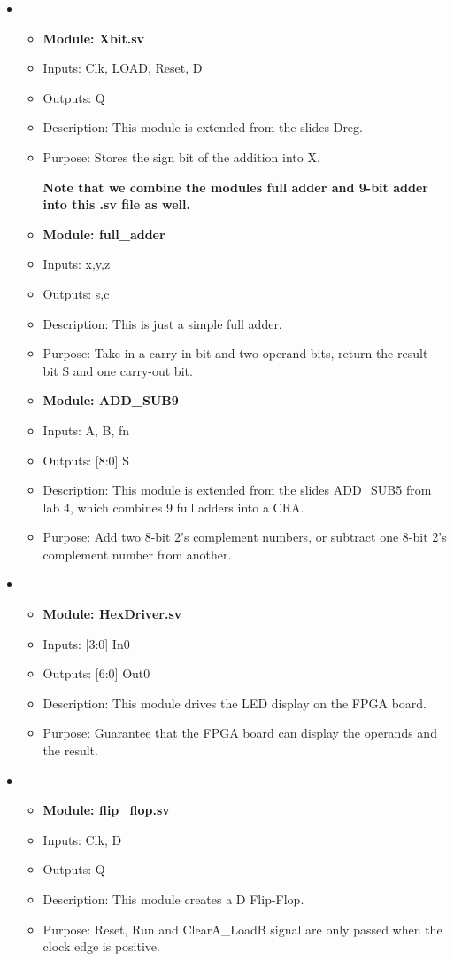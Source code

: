 \documentclass[11pt]{article}
\begin{document}
\begin{itemize}
    \item
    \begin{itemize}
        \item \textbf{Module: Xbit.sv}
        \item Inputs: Clk, LOAD, Reset, D
        \item Outputs: Q
        \item Description: This module is extended from the slides Dreg. 
        \item Purpose: Stores the sign bit of the addition into X.
        
        \textbf{Note that we combine the modules full adder and 9-bit adder into this .sv file as well.}
        \item \textbf{Module: full\_adder}
        \item Inputs: x,y,z
        \item Outputs: s,c
        \item Description: This is just a simple full adder.
        \item Purpose: Take in a carry-in bit and two operand bits, return the result bit S and one carry-out bit.
        \item \textbf{Module: ADD\_SUB9}
        \item Inputs: A, B, fn
        \item Outputs: [8:0] S
        \item Description: This module is extended from the slides ADD\_SUB5 from lab 4, which combines 9 full adders into a CRA.
        \item Purpose: Add two 8-bit 2’s complement numbers, or subtract one 8-bit 2’s complement number from another.
    \end{itemize}

    \item
    \begin{itemize}
        \item \textbf{Module: HexDriver.sv}
        \item Inputs: [3:0]  In0
        \item Outputs: [6:0]  Out0
        \item Description: This module drives the LED display on the FPGA board.
        \item Purpose: Guarantee that the FPGA board can display the operands and the result.
    \end{itemize}

    \item
    \begin{itemize}
        \item \textbf{Module: flip\_flop.sv}
        \item Inputs: Clk, D
        \item Outputs: Q
        \item Description: This module creates a D Flip-Flop.
        \item Purpose: Reset, Run and ClearA\_LoadB signal are only passed when the clock edge is positive.
    \end{itemize}


\end{itemize}
\end{document}
